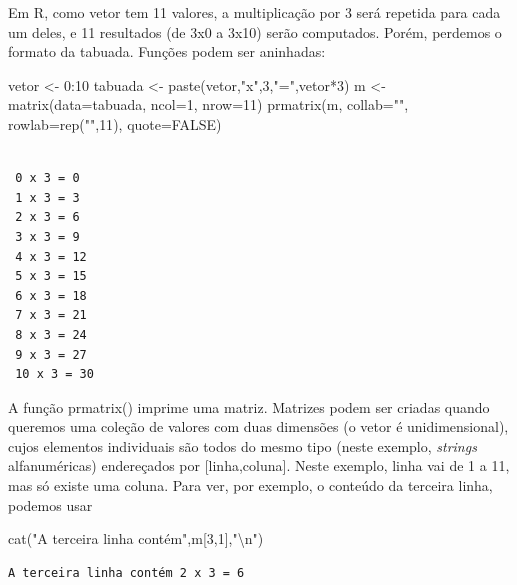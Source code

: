 \documentclass[
]{article}
\newenvironment{Shaded}{\begin{snugshade}}{\end{snugshade}}
\newcommand{\AttributeTok}[1]{\textcolor[rgb]{0.77,0.63,0.00}{#1}}
\newcommand{\ConstantTok}[1]{\textcolor[rgb]{0.00,0.00,0.00}{#1}}
\newcommand{\DecValTok}[1]{\textcolor[rgb]{0.00,0.00,0.81}{#1}}
\newcommand{\FunctionTok}[1]{\textcolor[rgb]{0.00,0.00,0.00}{#1}}
\newcommand{\NormalTok}[1]{#1}
\newcommand{\OtherTok}[1]{\textcolor[rgb]{0.56,0.35,0.01}{#1}}
\newcommand{\SpecialCharTok}[1]{\textcolor[rgb]{0.00,0.00,0.00}{#1}}
\newcommand{\StringTok}[1]{\textcolor[rgb]{0.31,0.60,0.02}{#1}}
\begin{document}
Em R, como vetor tem 11 valores, a multiplicação por 3 será repetida
para cada um deles, e 11 resultados (de 3x0 a 3x10) serão computados.
Porém, perdemos o formato da tabuada. Funções podem ser aninhadas:

\begin{Shaded}
\begin{Highlighting}[]
\NormalTok{vetor }\OtherTok{\textless{}{-}} \DecValTok{0}\SpecialCharTok{:}\DecValTok{10}
\NormalTok{tabuada }\OtherTok{\textless{}{-}} \FunctionTok{paste}\NormalTok{(vetor,}\StringTok{"x"}\NormalTok{,}\DecValTok{3}\NormalTok{,}\StringTok{"="}\NormalTok{,vetor}\SpecialCharTok{*}\DecValTok{3}\NormalTok{)}
\NormalTok{m }\OtherTok{\textless{}{-}} \FunctionTok{matrix}\NormalTok{(}\AttributeTok{data=}\NormalTok{tabuada, }\AttributeTok{ncol=}\DecValTok{1}\NormalTok{, }\AttributeTok{nrow=}\DecValTok{11}\NormalTok{)}
\FunctionTok{prmatrix}\NormalTok{(m, }\AttributeTok{collab=}\StringTok{""}\NormalTok{, }\AttributeTok{rowlab=}\FunctionTok{rep}\NormalTok{(}\StringTok{""}\NormalTok{,}\DecValTok{11}\NormalTok{), }\AttributeTok{quote=}\ConstantTok{FALSE}\NormalTok{)}
\end{Highlighting}
\end{Shaded}

\begin{verbatim}
            
 0 x 3 = 0  
 1 x 3 = 3  
 2 x 3 = 6  
 3 x 3 = 9  
 4 x 3 = 12 
 5 x 3 = 15 
 6 x 3 = 18 
 7 x 3 = 21 
 8 x 3 = 24 
 9 x 3 = 27 
 10 x 3 = 30
\end{verbatim}

A função prmatrix() imprime uma matriz. Matrizes podem ser criadas
quando queremos uma coleção de valores com duas dimensões (o vetor é
unidimensional), cujos elementos individuais são todos do mesmo tipo
(neste exemplo, \emph{strings} alfanuméricas) endereçados por
{[}linha,coluna{]}. Neste exemplo, linha vai de 1 a 11, mas só existe
uma coluna. Para ver, por exemplo, o conteúdo da terceira linha, podemos
usar

\begin{Shaded}
\begin{Highlighting}[]
\FunctionTok{cat}\NormalTok{(}\StringTok{"A terceira linha contém"}\NormalTok{,m[}\DecValTok{3}\NormalTok{,}\DecValTok{1}\NormalTok{],}\StringTok{"}\SpecialCharTok{\textbackslash{}n}\StringTok{"}\NormalTok{)}
\end{Highlighting}
\end{Shaded}

\begin{verbatim}
A terceira linha contém 2 x 3 = 6 
\end{verbatim}
\end{document}
